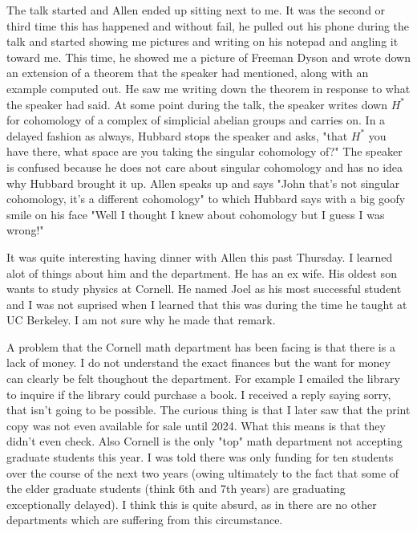 \documentclass[12pt]{article}
\begin{document}
The talk started and Allen ended up sitting next to me. It was the second or third time this has happened and without fail, he pulled out his phone during the talk
and started showing me pictures and writing on his notepad and angling it toward me. This time, he showed me a picture of Freeman Dyson and wrote down an extension of a theorem that 
the speaker had mentioned, along with an example computed out. He saw me writing down the theorem in response to what the speaker had said. At some point during the talk, the speaker 
writes down $H^*$ for cohomology of a complex of simplicial abelian groups and carries on. In a delayed fashion as always, Hubbard stops the speaker and asks, "that $H^*$ you have there, 
what space are you taking the singular cohomology of?" The speaker is confused because he does not care about singular cohomology and has no idea why Hubbard brought it up. Allen speaks up and 
says "John that's not singular cohomology, it's a different cohomology" to which Hubbard says with a big goofy smile on his face "Well I thought I knew about cohomology but I guess I was wrong!"

\hfill

It was quite interesting having dinner with Allen this past Thursday. I learned alot of things about him
and the department. He has an ex wife. His oldest son wants to study physics at Cornell. He named Joel 
as his most successful student and I was not suprised when I learned that this was 
during the time he taught at UC Berkeley. I am not sure why he made that remark.

\hfill

A problem that the Cornell math department has been facing is that there is a lack of money. 
I do not understand the exact finances but the want for money can clearly be felt thoughout the department.
For example I emailed the library to inquire if the library could purchase a book. I received a reply saying sorry, that 
isn't going to be possible. The curious thing is that I later saw that the print copy was not even available for sale until 2024.
What this means is that they didn't even check. Also Cornell is the only "top" math department not accepting graduate students this year.
I was told there was only funding for ten students over the course of the next two years (owing ultimately to the fact that
some of the elder graduate students (think 6th and 7th years) are graduating exceptionally delayed). I think this is quite absurd, as in there are no 
other departments which are suffering from this circumstance.
\end{document}
